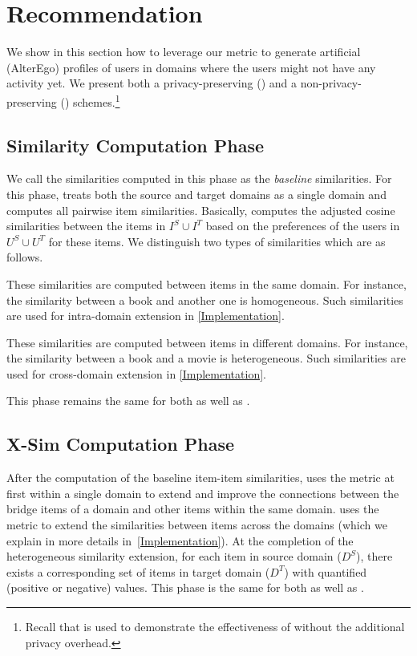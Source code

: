 \vspace{-2mm}
\section{Recommendation}
\label{Recommendation}
We show in this section how to leverage our \graphsim metric to generate artificial (AlterEgo) profiles of users in domains where the users might not have any activity yet. We present both a privacy-preserving (\crossrec) and a non-privacy-preserving (\npcrossrec) schemes.\footnote{Recall that \npcrossrec is used to demonstrate the effectiveness of \graphsim without the additional privacy overhead.}  

\subsection{Similarity Computation Phase}
We call the similarities computed in this phase as the \emph{baseline} similarities. For this phase, \crossrec treats both the source and target domains as a single domain and computes all pairwise item similarities. Basically, \crossrec computes the adjusted cosine similarities between the items in $I^S \cup I^T$ based on the preferences of the users in $U^S \cup U^T$ for these items. We distinguish two types of similarities which are as follows.

 These similarities are computed between items in the same domain. For instance, the similarity between a book and another one is homogeneous. Such similarities are used for intra-domain extension in \autoref{Implementation}.

 These similarities are computed between items in different domains. For instance, the similarity between a book and a movie is heterogeneous. Such similarities are used for cross-domain extension in \autoref{Implementation}.

This phase remains the same for both \crossrec as well as \npcrossrec.


\subsection{X-Sim Computation Phase}
After the computation of the baseline item-item similarities, \crossrec uses the \graphsim metric at first within a single domain to extend and improve the connections between the bridge items of a domain and other items within the same domain. \crossrec uses the \graphsim metric to extend the similarities between items across the domains (which we explain in more details in~\autoref{Implementation}). At the completion of the heterogeneous similarity extension, for each item in source domain ($D^S$), there exists a corresponding set of items in target domain ($D^T$) with quantified (positive or negative) \graphsim values. This phase is the same for both \crossrec as well as \npcrossrec.

